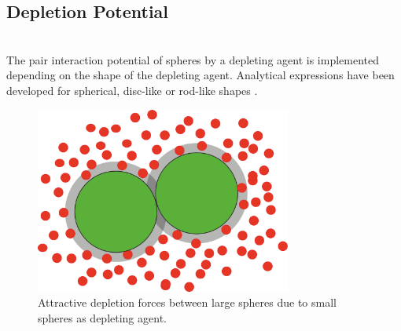 \newpage
\subsection{Depletion Potential}
~\\

The pair interaction potential of spheres by a depleting agent is implemented depending on the shape of the depleting agent. Analytical expressions have been developed for
spherical, disc-like or rod-like shapes \cite{Oversteegen2004,Lekkerkerker2011}.

\begin{figure}[htb]
\includegraphics[width=0.75\textwidth]{../images/OZsolver/potentials/DepletionSketchSphSph.png}  \caption{Attractive depletion forces between large spheres due to small spheres as depleting agent.}
\end{figure}

